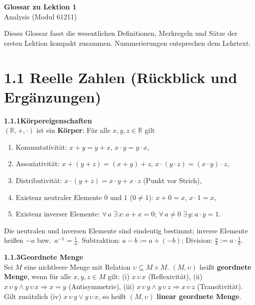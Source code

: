 \documentclass[a4paper,12pt]{article}
\newcommand{\gentry}[3]{%
  \noindent\textbf{#1\quad #2}\nopagebreak\\[0.2em]
  #3\par\smallskip
}
\begin{document}
\begin{center}
  {\LARGE\bfseries Glossar zu Lektion 1}\\[0.5em]
  {\large Analysis (Modul 61211)}
\end{center}

\vspace{1em}

Dieses Glossar fasst die wesentlichen Definitionen, Merkregeln und Sätze der
ersten Lektion kompakt zusammen. Nummerierungen entsprechen dem Lehrtext.

\section*{1.1 \quad Reelle Zahlen (Rückblick und Ergänzungen)}

\gentry{1.1.1}{Körpereigenschaften}{%
  $(\mathbb{R}, +, \cdot)$ ist ein \textbf{Körper}: Für alle $x, y, z \in \mathbb{R}$ gilt
  \begin{enumerate}[label=(\roman*),topsep=2pt,itemsep=1pt]
    \item Kommutativität: $x+y = y+x$, $x \cdot y = y \cdot x$,
    \item Assoziativität: $x+(y+z) = (x+y)+z$, $x\cdot(y\cdot z) = (x\cdot y)\cdot z$,
    \item Distributivität: $x\cdot(y+z) = x\cdot y + x\cdot z$ \quad (Punkt vor Strich),
    \item Existenz neutraler Elemente $0$ und $1$ ($0 \neq 1$): $x+0 = x$, $x\cdot 1 = x$,
    \item Existenz inverser Elemente: $\forall\, a \;\exists\, x: a+x = 0$; $\forall\, a \neq 0 \;\exists\, y: a\cdot y = 1$.
  \end{enumerate}
  Die neutralen und inversen Elemente sind eindeutig bestimmt; inverse Elemente heißen $-a$
  bzw.\ $a^{-1} = \frac{1}{a}$. Subtraktion: $a - b := a + (-b)$; Division: $\frac{a}{b} := a \cdot \frac{1}{b}$.
}

\gentry{1.1.3}{Geordnete Menge}{%
  Sei $M$ eine nichtleere Menge mit Relation $\upsilon \subseteq M \times M$.
  $(M, \upsilon)$ heißt \textbf{geordnete Menge}, wenn für alle $x, y, z \in M$ gilt:
  (i) $x\,\upsilon\,x$ (Reflexivität),
  (ii) $x\,\upsilon\,y \land y\,\upsilon\,x \Rightarrow x = y$ (Antisymmetrie),
  (iii) $x\,\upsilon\,y \land y\,\upsilon\,z \Rightarrow x\,\upsilon\,z$ (Transitivität).\\
  Gilt zusätzlich (iv) $x\,\upsilon\,y \lor y\,\upsilon\,x$, so heißt $(M, \upsilon)$
  \textbf{linear geordnete Menge}.
}
\end{document}
